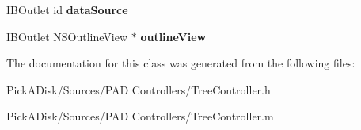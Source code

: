 \begin{DoxyCompactItemize}
\item 
\hypertarget{interface_tree_controller_a8026a3a0ca58f0cf1e2cda5f768d66f7}{
IBOutlet id {\bfseries dataSource}}
\label{interface_tree_controller_a8026a3a0ca58f0cf1e2cda5f768d66f7}

\item 
\hypertarget{interface_tree_controller_a3769ed57eaccb3f86917ebe30f8c5400}{
IBOutlet NSOutlineView $\ast$ {\bfseries outlineView}}
\label{interface_tree_controller_a3769ed57eaccb3f86917ebe30f8c5400}

\end{DoxyCompactItemize}


The documentation for this class was generated from the following files:\begin{DoxyCompactItemize}
\item 
PickADisk/Sources/PAD Controllers/TreeController.h\item 
PickADisk/Sources/PAD Controllers/TreeController.m\end{DoxyCompactItemize}
